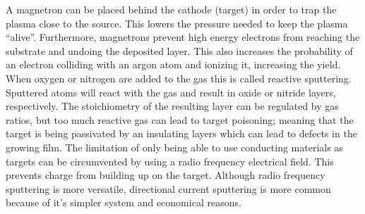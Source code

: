 A magnetron can be placed behind the cathode (target) in order to trap the plasma close to the source. 
This lowers the pressure needed to keep the plasma ``alive''. 
Furthermore, magnetrons prevent high energy electrons from reaching the substrate and 
undoing the deposited layer.
This also increases the probability of an electron 
colliding with an argon atom and ionizing it, increasing the yield.
%
When oxygen or nitrogen are added to the gas this is called reactive sputtering.
Sputtered atoms will react with the gas and result in oxide or nitride layers, respectively.
The stoichiometry of the resulting layer can be regulated by gas ratios, but too much reactive gas can lead to target poisoning;
meaning that the target is being passivated by an insulating layers which can lead to defects in the growing film\cite{Kelly2000}. 
%
The limitation of only being able to use conducting materials as targets can be circumvented by using a radio frequency electrical field. 
This prevents charge from building up on the target. \linebreak[2]
Although radio frequency sputtering is more versatile, directional current sputtering is more common because of it's simpler system and economical reasons.

\pagebreak[4]

